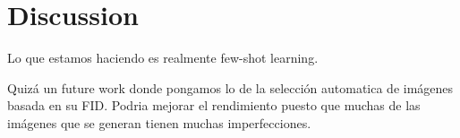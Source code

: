\chapter{Discussion} \label{sec:discussion}

Lo que estamos haciendo es realmente few-shot learning.


Quizá un future work donde pongamos  lo de la selección automatica de imágenes basada en su FID. Podria mejorar el rendimiento puesto que muchas de las imágenes que se generan tienen muchas imperfecciones.